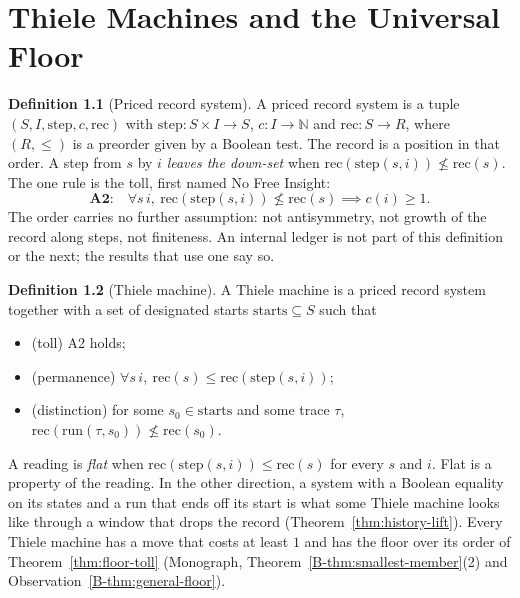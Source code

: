 \documentclass[11pt, a4paper]{report}
\theoremstyle{definition}
\newtheorem{definition}{Definition}[chapter]
\theoremstyle{plain}
\newcommand{\N}{\mathbb{N}}
\newcommand{\cost}{c}
\begin{document}
\chapter{Thiele Machines and the Universal Floor}\label{ch:nfi}

\begin{definition}[Priced record system]
A priced record system is a tuple $(S, I, \mathrm{step}, \cost, \mathrm{rec})$ with $\mathrm{step} : S \times I \to S$, $\cost : I \to \N$ and $\mathrm{rec} : S \to R$, where $(R,\le)$ is a preorder given by a Boolean test. The record is a position in that order. A step from $s$ by $i$ \emph{leaves the down-set} when $\mathrm{rec}(\mathrm{step}(s,i)) \not\le \mathrm{rec}(s)$. The one rule is the toll, first named No Free Insight:
\[
\textbf{A2:}\quad \forall s\, i,\ \mathrm{rec}(\mathrm{step}(s,i)) \not\le \mathrm{rec}(s) \implies \cost(i) \ge 1.
\]
The order carries no further assumption: not antisymmetry, not growth of the
record along steps, not finiteness. An internal ledger is not part of this
definition or the next; the results that use one say so.
\end{definition}

\begin{definition}[Thiele machine]\label{def:member}
A Thiele machine is a priced record system together with a set of designated
starts $\mathrm{starts} \subseteq S$ such that
\begin{itemize}
  \item (toll) A2 holds;
  \item (permanence) $\forall s\, i,\ \mathrm{rec}(s) \le \mathrm{rec}(\mathrm{step}(s,i))$;
  \item (distinction) for some $s_0 \in \mathrm{starts}$ and some trace $\tau$,
    $\mathrm{rec}(\mathrm{run}(\tau, s_0)) \not\le \mathrm{rec}(s_0)$.
\end{itemize}
A reading is \emph{flat} when $\mathrm{rec}(\mathrm{step}(s,i)) \le \mathrm{rec}(s)$
for every $s$ and $i$. Flat is a property of the reading. In the other direction, a system with
a Boolean equality on its states and a run that ends off its start is what some
Thiele machine looks like through a window that drops the record
(Theorem~\ref{thm:history-lift}).
Every Thiele machine has a move that costs at least $1$ and has the floor
over its order of Theorem~\ref{thm:floor-toll} (Monograph,
Theorem~\ref{B-thm:smallest-member}(2) and Observation~\ref{B-thm:general-floor}).
\end{definition}
\end{document}

